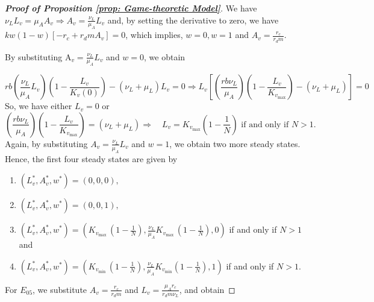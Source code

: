 \documentclass{article}
\theoremstyle{remark}
\theoremstyle{custom} %
\begin{document}
\begin{proof} [\textbf{Proof of Proposition \ref{prop: Game-theoretic Model}}]
    

We have $\nu_L L_v=\mu_A A_v \Longrightarrow A_v=\frac{\nu_L}{\mu_A} L_v$ and, by setting the derivative to zero, we have $k  w(1-w)\left[-r_c+r_d  m  A_v\right]=0$, which implies,  $w=0, w=1$ and $A_v=\frac{r_c}{r_d  m}$.

By substituting $\mathrm{A}_v=\frac{\nu_L}{\mu_A} L_v$ and $w=0$, we obtain

$$
 rb\left(\frac{\nu_L}{\mu_A} L_v\right)\left(1-\frac{L_v}{K_v(0)}\right)-\left(\nu_L+\mu_L\right) L_v=0 
\Rightarrow  L_v\left[\left(\frac{r  b  \nu_L}{\mu_A}\right)\left(1-\frac{L_v}{K_{v_{\max }}}\right)-\left(\nu_L+\mu_L\right)\right]=0
$$
So, we have either $L_v=0$ or
$$
\left(\frac{rb\nu_L}{\mu_A}\right)\left(1-\frac{L_v}{K_{v_{\max }}}\right)=\left(\nu_L+\mu_L\right)
\Rightarrow \quad  L_v=K_{v_{\max }}\left(1-\frac{1}{N}\right) \text { if and only if } N>1.
$$
Again, by substituting $A_v=\frac{\nu_L}{\mu_A} L_v$ and $w=1$, we obtain two more steady states. Hence, the first four steady states are given by

\begin{enumerate}
\item \underline{} $\left(L_v^*, A_v^*, w^*\right)=(0,0,0),$ 

\item \underline{} $\left(L_v^*, A_v^*, w^*\right)=(0,0,1),$

\item \underline{} $\left(L_v^*, A_v^*, w^*\right)=\left(K_{v_{\text {max }}}\left(1-\frac{1}{{N}}\right), \frac{\nu_L}{\mu_A} K_{v_{\text {max }}}\left(1-\frac{1}{{N}}\right), 0\right)$ if and only if ${N}>1$ and

\item \underline{} $\left(L_v^*, A_v^*, w^*\right)=\left(K_{v_{\text {min }}}\left(1-\frac{1}{N}\right), \frac{\nu_L}{\mu_A} K_{v_{\min }}\left(1-\frac{1}{{N}}\right), 1\right)$ if and only if ${N}>1$.
\end{enumerate}

For $E_{05}$, we substitute  $A_v=\frac{r_c}{r_d  m}$ and $L_v=\frac{\mu_A r_c}{r_d m \nu_L}$, and obtain


\end{proof}
\end{document}
